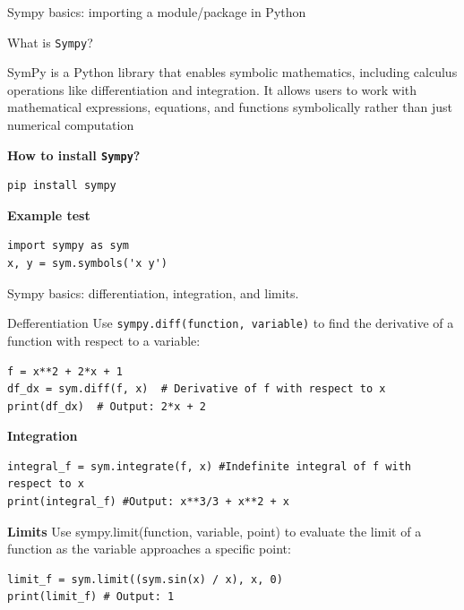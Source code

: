 \documentclass[10pt]{beamer}
\newcommand{\gd}[2]{\begin{debox}[label=#1]#2\end{debox}}
\begin{document}
\begin{frame}[fragile]{Sympy basics: importing a module/package in Python}
\begin{block} {What is \texttt{Sympy}?}
\vspace*{0.1cm}
\gd{impliciteintersection}{
SymPy is a Python library that enables symbolic mathematics, including calculus operations like differentiation and integration. It allows users to work with mathematical expressions, equations, and functions symbolically rather than just numerical computation}
\end{block}

\begin{block}{\textbf{How to install \texttt{Sympy}?}}
\vspace{0.2cm}
\begin{lstlisting}[style=mypython]
pip install sympy 
\end{lstlisting}
\end{block}

\begin{block}{\textbf{Example test}}
\vspace{0.2cm}
\begin{lstlisting}[style=mypython]
import sympy as sym
x, y = sym.symbols('x y')
\end{lstlisting}
\end{block}

\end{frame}

\begin{frame}[fragile]{Sympy basics: differentiation, integration, and limits.}
\begin{block} {Defferentiation}
\vspace*{0.1cm}
Use \texttt{sympy.diff(function, variable)} to find the derivative of a function with respect to a variable:
\begin{lstlisting}[style=mypython]
f = x**2 + 2*x + 1
df_dx = sym.diff(f, x)  # Derivative of f with respect to x
print(df_dx)  # Output: 2*x + 2
\end{lstlisting}
\end{block}	
\vspace{-0.4cm}
\begin{block}{\textbf{Integration}}
\vspace{0.1cm}
\begin{lstlisting}[style=mypython]
integral_f = sym.integrate(f, x) #Indefinite integral of f with respect to x
print(integral_f) #Output: x**3/3 + x**2 + x
\end{lstlisting}
\end{block}
\vspace{-0.4cm}
\begin{block}{\textbf{Limits}}
\vspace{0.1cm}
Use sympy.limit(function, variable, point) to evaluate the limit of a function as the variable approaches a specific point: 
\begin{lstlisting}[style=mypython]
limit_f = sym.limit((sym.sin(x) / x), x, 0)
print(limit_f) # Output: 1
\end{lstlisting}
\end{block}

\end{frame}
\end{document}

